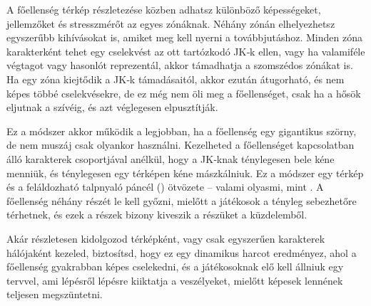 A főellenség térkép részletezése közben adhatsz különböző képességeket, jellemzőket és stresszmérőt az egyes zónáknak. Néhány zónán elhelyezhetsz egyszerűbb kihívásokat is, amiket meg kell nyerni a továbbjutáshoz. Minden zóna karakterként tehet egy cselekvést az ott tartózkodó JK‑k ellen, vagy ha valamiféle végtagot vagy hasonlót reprezentál, akkor támadhatja a szomszédos zónákat is. Ha egy zóna kiejtődik a JK‑k támadásaitól, akkor ezután átugorható, és nem képes többé cselekvésekre, de ez még nem öli meg a főellenséget, csak ha a hősök eljutnak a szívéig, és azt véglegesen elpusztítják.

Ez a módszer akkor működik a legjobban, ha a főellenség egy gigantikus szörny, de nem muszáj csak olyankor használni. Kezelheted a főellenséget kapcsolatban álló karakterek csoportjával anélkül, hogy a JK‑knak ténylegesen bele kéne menniük, és ténylegesen egy térképen kéne mászkálniuk. Ez a módszer egy térkép és a feláldozható talpnyaló páncél () ötvözete – valami olyasmi, mint . A főellenség néhány részét le kell győzni, mielőtt a játékosok a tényleg sebezhetőre térhetnek, és ezek a részek bizony kiveszik a részüket a küzdelemből.

Akár részletesen kidolgozod térképként, vagy csak egyszerűen karakterek hálójaként kezeled, biztosítsd, hogy ez egy dinamikus harcot eredményez, ahol a főellenség gyakrabban képes cselekedni, és a játékosoknak elő kell állniuk egy tervvel, ami lépésről lépésre kiiktatja a veszélyeket, mielőtt képesek lennének teljesen megszüntetni.
